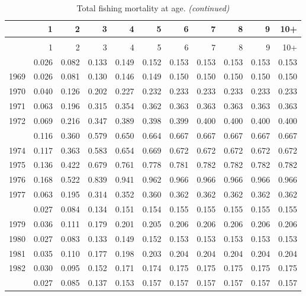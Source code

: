 \documentclass[
]{article}
\begin{document}
\begin{longtable}[t]{lrrrrrrrrrr}
\caption{\label{tab:FAA-tot-table}Total fishing mortality at age.}\\
\toprule
  & 1 & 2 & 3 & 4 & 5 & 6 & 7 & 8 & 9 & 10+\\
\midrule
\endfirsthead
\caption[]{Total fishing mortality at age. \textit{(continued)}}\\
\toprule
  & 1 & 2 & 3 & 4 & 5 & 6 & 7 & 8 & 9 & 10+\\
\midrule
\endhead

\endfoot
\bottomrule
\endlastfoot
1968 & 0.026 & 0.082 & 0.133 & 0.149 & 0.152 & 0.153 & 0.153 & 0.153 & 0.153 & 0.153\\
1969 & 0.026 & 0.081 & 0.130 & 0.146 & 0.149 & 0.150 & 0.150 & 0.150 & 0.150 & 0.150\\
1970 & 0.040 & 0.126 & 0.202 & 0.227 & 0.232 & 0.233 & 0.233 & 0.233 & 0.233 & 0.233\\
1971 & 0.063 & 0.196 & 0.315 & 0.354 & 0.362 & 0.363 & 0.363 & 0.363 & 0.363 & 0.363\\
1972 & 0.069 & 0.216 & 0.347 & 0.389 & 0.398 & 0.399 & 0.400 & 0.400 & 0.400 & 0.400\\
\addlinespace
1973 & 0.116 & 0.360 & 0.579 & 0.650 & 0.664 & 0.667 & 0.667 & 0.667 & 0.667 & 0.667\\
1974 & 0.117 & 0.363 & 0.583 & 0.654 & 0.669 & 0.672 & 0.672 & 0.672 & 0.672 & 0.672\\
1975 & 0.136 & 0.422 & 0.679 & 0.761 & 0.778 & 0.781 & 0.782 & 0.782 & 0.782 & 0.782\\
1976 & 0.168 & 0.522 & 0.839 & 0.941 & 0.962 & 0.966 & 0.966 & 0.966 & 0.966 & 0.966\\
1977 & 0.063 & 0.195 & 0.314 & 0.352 & 0.360 & 0.362 & 0.362 & 0.362 & 0.362 & 0.362\\
\addlinespace
1978 & 0.027 & 0.084 & 0.134 & 0.151 & 0.154 & 0.155 & 0.155 & 0.155 & 0.155 & 0.155\\
1979 & 0.036 & 0.111 & 0.179 & 0.201 & 0.205 & 0.206 & 0.206 & 0.206 & 0.206 & 0.206\\
1980 & 0.027 & 0.083 & 0.133 & 0.149 & 0.152 & 0.153 & 0.153 & 0.153 & 0.153 & 0.153\\
1981 & 0.035 & 0.110 & 0.177 & 0.198 & 0.203 & 0.204 & 0.204 & 0.204 & 0.204 & 0.204\\
1982 & 0.030 & 0.095 & 0.152 & 0.171 & 0.174 & 0.175 & 0.175 & 0.175 & 0.175 & 0.175\\
\addlinespace
1983 & 0.027 & 0.085 & 0.137 & 0.153 & 0.157 & 0.157 & 0.157 & 0.157 & 0.157 & 0.157\\

\end{longtable}
\end{document}

